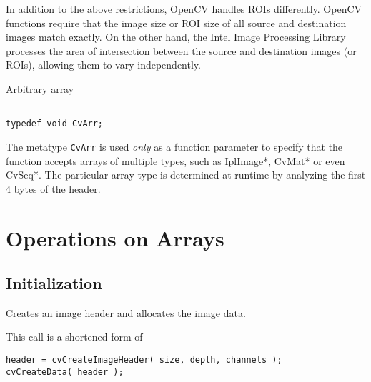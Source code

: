 In addition to the above restrictions, OpenCV handles ROIs differently. OpenCV functions require that the image size or ROI size of all source and destination images match exactly. On the other hand, the Intel Image Processing Library processes the area of intersection between the source and destination images (or ROIs), allowing them to vary independently. 


Arbitrary array

\begin{lstlisting}

typedef void CvArr;

\end{lstlisting}

The metatype \texttt{CvArr} is used \textit{only} as a function parameter to specify that the function accepts arrays of multiple types, such as IplImage*, CvMat* or even CvSeq*. The particular array type is determined at runtime by analyzing the first 4 bytes of the header.


\section{Operations on Arrays}

\subsection{Initialization}

\label{CreateImage}

Creates an image header and allocates the image data.


\begin{description}
\end{description}

This call is a shortened form of

\begin{lstlisting}
header = cvCreateImageHeader( size, depth, channels );
cvCreateData( header );
\end{lstlisting}


